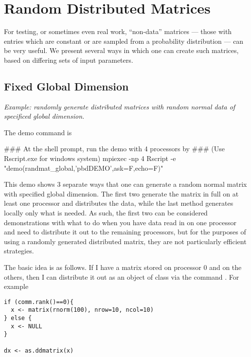 \section{Random Distributed Matrices}
\label{sec:reader}

For testing, or sometimes even real work, ``non-data'' matrices --- those with entries which are constant or are sampled from a probability distribution --- can be very useful.  We present several ways in which one can create such matrices, based on differing sets of input parameters.

\subsection{Fixed Global Dimension}\label{subsec:rng.gl}

\emph{Example:  randomly generate distributed matrices with random normal data of specificed global dimension.}

The demo command is
\begin{Command}
### At the shell prompt, run the demo with 4 processors by
### (Use Rscript.exe for windows system)
mpiexec -np 4 Rscript -e "demo(randmat_global,'pbdDEMO',ask=F,echo=F)"
\end{Command}

This demo shows 3 separate ways that one can generate a random normal matrix with specified global dimension.  The first two generate the matrix in full on at least one processor and distributes the data, while the last method generates locally only what is needed.  As such, the first two can be considered demonstrations with what to do when you have data read in on one processor and need to distribute it out to the remaining processors, but for the purposes of using a randomly generated distributed matrix, they are not particularly efficient strategies.

The basic idea is as follows.  If I have a matrix  stored on processor 0 and  on the others, then I can distribute it out as an object of class  via the command .  For example
\begin{lstlisting}[language=rr]
if (comm.rank()==0){
  x <- matrix(rnorm(100), nrow=10, ncol=10)
} else {
  x <- NULL
}

dx <- as.ddmatrix(x)
\end{lstlisting}


